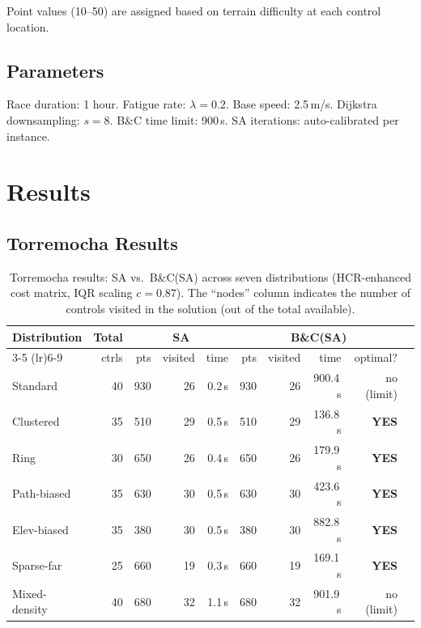 \documentclass[11pt,a4paper]{article}
\begin{document}
Point values (10--50) are assigned based on terrain difficulty at each control location.

\subsection{Parameters}

Race duration: 1 hour.
Fatigue rate: $\lambda = 0.2$.
Base speed: 2.5\,m/s.
Dijkstra downsampling: $s = 8$.
B\&C time limit: 900\,s.
SA iterations: auto-calibrated per instance.

\section{Results}
\label{sec:results}

\subsection{Torremocha Results}

\begin{table}[H]
\centering
\caption{Torremocha results: SA vs.\ B\&C(SA) across seven distributions (HCR-enhanced cost matrix, IQR scaling $c = 0.87$). The ``nodes'' column indicates the number of controls visited in the solution (out of the total available).}
\label{tab:torremocha}
\begin{tabular}{lrrrrrrrrc}
\toprule
\textbf{Distribution} & \textbf{Total} & \multicolumn{3}{c}{\textbf{SA}} & \multicolumn{4}{c}{\textbf{B\&C(SA)}} \\
\cmidrule(lr){3-5} \cmidrule(lr){6-9}
& ctrls & pts & visited & time & pts & visited & time & optimal? \\
\midrule
Standard        & 40 &  930 & 26 & 0.2\,s &  930 & 26 & 900.4\,s & no (limit) \\
Clustered       & 35 &  510 & 29 & 0.5\,s &  510 & 29 & 136.8\,s & \textbf{YES} \\
Ring            & 30 &  650 & 26 & 0.4\,s &  650 & 26 & 179.9\,s & \textbf{YES} \\
Path-biased     & 35 &  630 & 30 & 0.5\,s &  630 & 30 & 423.6\,s & \textbf{YES} \\
Elev-biased     & 35 &  380 & 30 & 0.5\,s &  380 & 30 & 882.8\,s & \textbf{YES} \\
Sparse-far      & 25 &  660 & 19 & 0.3\,s &  660 & 19 & 169.1\,s & \textbf{YES} \\
Mixed-density   & 40 &  680 & 32 & 1.1\,s &  680 & 32 & 901.9\,s & no (limit) \\
\bottomrule
\end{tabular}
\end{table}
\end{document}
